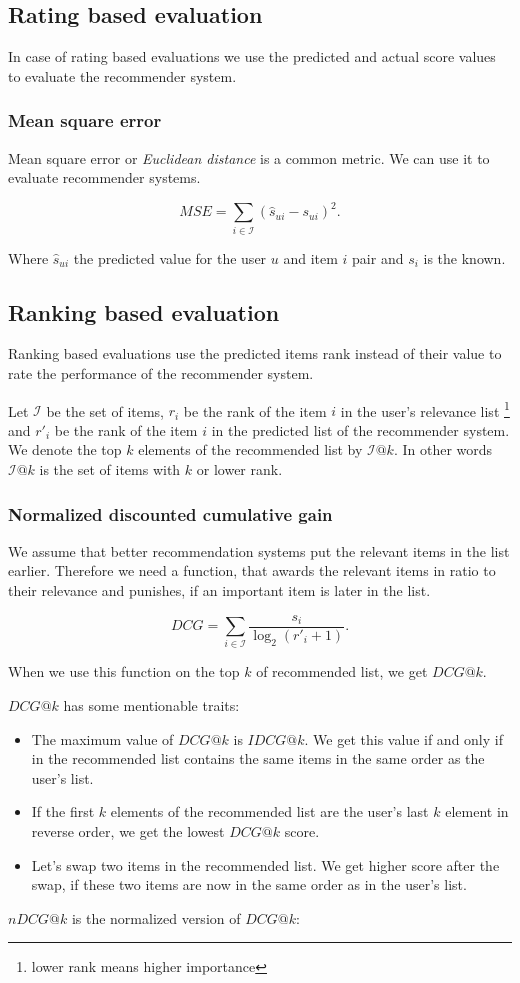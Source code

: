\subsection{Rating based evaluation }
In case of rating based evaluations we use the predicted and actual score values to evaluate 
the recommender system.

\subsubsection{Mean square error}
Mean square error or \emph{Euclidean distance} is a common metric. We can use it to
evaluate recommender systems.

\[MSE=\sum_{i\in\mathcal{I}}(\hat{s}_{ui} - s_{ui})^2.\]

Where $\hat{s}_{ui}$ the predicted value for the user $u$ and item $i$ pair and $s_i$ is the known.


\subsection{Ranking based evaluation}
Ranking based evaluations use the predicted items rank instead of their value to rate the
performance of the recommender system.

Let $\mathcal{I}$ be the set of items, $r_i$ be the rank of the item $i$ in the
user's relevance list \footnote{lower rank means higher importance}  and
$r'_i$ be the rank of the item $i$ in the predicted list of the recommender system.
We denote the top $k$ elements of the recommended list by $\mathcal{I}@k$. In other words
$\mathcal{I}@k$ is the set of items with $k$ or lower rank. 

\subsubsection{Normalized discounted cumulative gain}
We assume that better recommendation systems put the relevant items
in the list earlier. Therefore we need a function, that awards the relevant items
in ratio to their relevance and punishes, if an important item is later in the
list. 

$$ DCG=\sum_{i \in \mathcal{I}}\frac{s_i}{\log_2(r'_i+1)}.$$

When we use this function on the top $k$ of recommended list, we get $DCG@k$.

$DCG@k$ has some mentionable traits:
\begin{itemize}
\item The maximum value of $DCG@k$ is $IDCG@k$. We get this value if and only if in the
  recommended list contains the same items in the same order as the user's list.
\item If the first $k$ elements of the recommended list are the user's last $k$ element in
  reverse order, we get the lowest $DCG@k$ score.
\item Let's swap two items in the recommended list. We get higher score after the
  swap, if these two items are now in the same order as in the user's list.
\end{itemize}
$nDCG@k$ is the normalized version of $DCG@k$:

